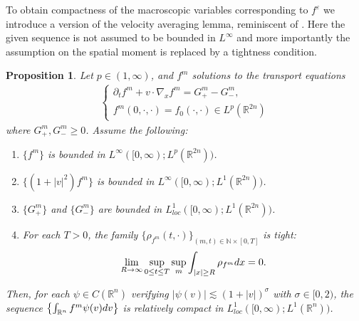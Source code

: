 \documentclass{amsart}
\theoremstyle{plain}
\newtheorem{proposition}[theorem]{Proposition}
\theoremstyle{remark}
\numberwithin{equation}{section}
\newcommand{\p}{\partial}
\newcommand{\N}{\mathbb{N}}
\newcommand{\R}{\mathbb{R}}
\newcommand{\ve}{\varepsilon}
\newcommand{\dx}{\textnormal{d}x}
\newcommand{\dv}{\textnormal{d}v}
\begin{document}
To obtain compactness of the macroscopic variables corresponding to $f^\ve$ we introduce a version of the velocity averaging lemma, reminiscent of \cite[Lemma 2.7]{karpermellettrivisa2013}. Here the given sequence is not assumed to be bounded in $L^\infty$ and more importantly the assumption on the spatial moment is replaced by a tightness condition.
\begin{proposition}
\label{Prop : Vel Avg Lem}
    Let $p\in (1,\infty)$, and $f^m$ solutions to the transport equations
    \begin{align*}
        \begin{cases}
        \p_t f^m + v \cdot \nabla_x f^m = G^m_+ - G^m_-, \\f^m(0,\cdot,\cdot) = f_0(\cdot,\cdot) \in L^p(\R^{2n})
        \end{cases}
    \end{align*}
    where $G^m_+, G^m_- \ge 0$. Assume the following:
    \begin{enumerate}
    \item $\{f^m\}$ is bounded in $L^\infty([0,\infty);L^p(\R^{2n}))$.
    \item $\{(1+|v|^2)f^m\}$ is bounded in $L^\infty([0,\infty);L^1(\R^{2n}))$.
    \item $\{G^m_+\}$ and $\{G^m_-\}$ are bounded in $L_{loc}^1([0,\infty);L^1(\R^{2n}))$.
    \item For each $T>0$, the family $\{\rho_{f^m}(t,\cdot)\}_{(m,t)\in\N\times[0,T]}$ is tight:
    \begin{align*}
    \lim_{R\to \infty} \sup_{0\le t \le T} \sup_{m} \int_{|x|\ge R} \rho_{f^m} \dx = 0.
    \end{align*}
    \end{enumerate}
    Then, for each $\psi \in C(\R^n)$ verifying $|\psi(v)| \lesssim (1+|v|)^\sigma$ with $\sigma\in [0,2)$, the sequence $\left\{\int_{\R^n}f^{m}\psi(v)\dv\right\}$ is relatively compact in $L_{loc}^1([0,\infty);L^1(\R^n))$.
\end{proposition}
\end{document}
